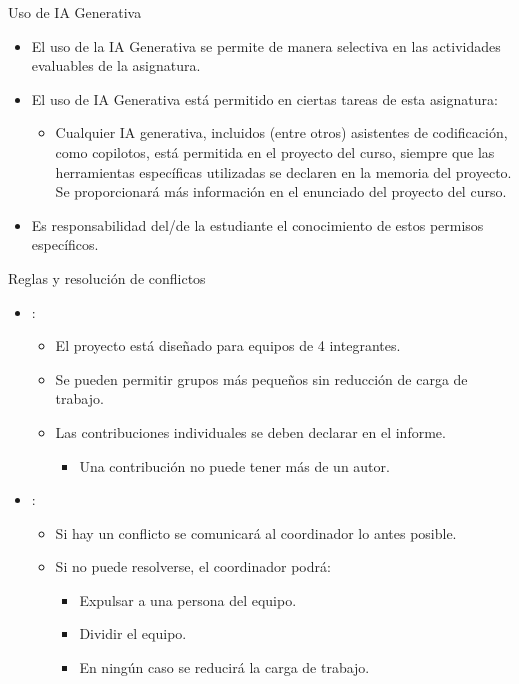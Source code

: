 \begin{frame}[t]{Uso de IA Generativa}
\begin{itemize}

\item El uso de la IA Generativa se permite de manera selectiva en las actividades evaluables de la asignatura.

\item El uso de IA Generativa está permitido en ciertas tareas de esta asignatura:

  \begin{itemize}

    \item Cualquier IA generativa, incluidos (entre otros) asistentes de codificación, como copilotos, está permitida en el proyecto del curso, siempre que las herramientas específicas utilizadas se declaren en la memoria del proyecto. Se proporcionará más información en el enunciado del proyecto del curso.

  \end{itemize}

\item Es responsabilidad del/de la estudiante el conocimiento de estos permisos específicos. 
\end{itemize}
\end{frame}

\begin{frame}[t]{Reglas y resolución de conflictos}
\begin{itemize}
  \item {}:
    \begin{itemize}
      \item El proyecto está diseñado para equipos de 4 integrantes.
      \item Se pueden permitir grupos más pequeños sin reducción de carga de trabajo.
      \item Las contribuciones individuales se deben declarar en el informe.
        \begin{itemize}
          \item Una contribución no puede tener más de un autor.
        \end{itemize}
    \end{itemize}

  \item {}:
    \begin{itemize}
      \item Si hay un conflicto se comunicará al coordinador lo antes posible.
      \item Si no puede resolverse, el coordinador podrá:
        \begin{itemize}
          \item Expulsar a una persona del equipo.
          \item Dividir el equipo.
          \item En ningún caso se reducirá la carga de trabajo.
        \end{itemize}
    \end{itemize}
\end{itemize}
\end{frame}


